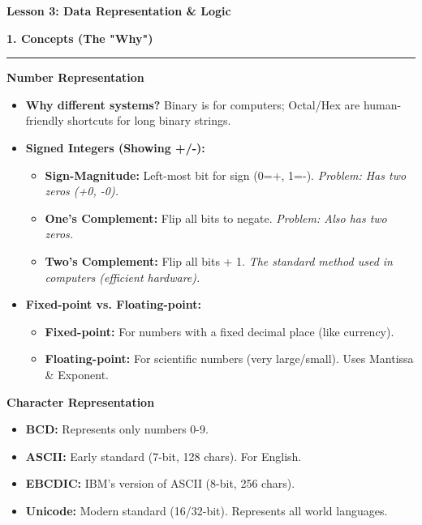 \documentclass[a4paper, 8pt]{extarticle}
\newcommand{\sectionheading}[1]{\large\textbf{#1}\par\noindent\rule{\linewidth}{0.4pt}}
\newcommand{\subsectionheading}[1]{\normalsize\textbf{#1}}
\begin{document}
\pagestyle{empty} %

\begin{center}
    \fontsize{12pt}{14pt}\selectfont
    \textbf{Lesson 3: Data Representation \& Logic}
\end{center}
\vspace{1em}

\begin{multicols}{2}


\sectionheading{1. Concepts (The "Why")}
\vspace{0.5em}

\subsectionheading{Number Representation}
\begin{itemize}
    \item \textbf{Why different systems?} Binary is for computers; Octal/Hex are human-friendly shortcuts for long binary strings.
    \item \textbf{Signed Integers (Showing +/-):}
    \begin{itemize}
        \item \textbf{Sign-Magnitude:} Left-most bit for sign (0=+, 1=-). \textit{Problem: Has two zeros (+0, -0).}
        \item \textbf{One's Complement:} Flip all bits to negate. \textit{Problem: Also has two zeros.}
        \item \textbf{Two's Complement:} Flip all bits + 1. \textit{The standard method used in computers (efficient hardware).}
    \end{itemize}
    \item \textbf{Fixed-point vs. Floating-point:}
    \begin{itemize}
        \item \textbf{Fixed-point:} For numbers with a fixed decimal place (like currency).
        \item \textbf{Floating-point:} For scientific numbers (very large/small). Uses Mantissa \& Exponent.
    \end{itemize}
\end{itemize}

\subsectionheading{Character Representation}
\begin{itemize}
    \item \textbf{BCD:} Represents only numbers 0-9.
    \item \textbf{ASCII:} Early standard (7-bit, 128 chars). For English.
    \item \textbf{EBCDIC:} IBM's version of ASCII (8-bit, 256 chars).
    \item \textbf{Unicode:} Modern standard (16/32-bit). Represents all world languages.
\end{itemize}


\end{multicols}
\end{document}
